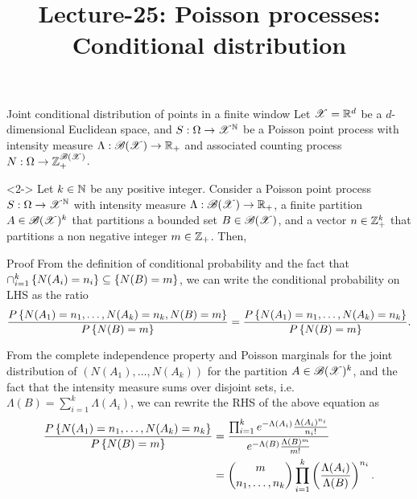 \documentclass[12pt,aspectratio=169]{beamer}
\title{Lecture-25: Poisson processes: Conditional distribution}
\date{}
\begin{document}
\pagestyle{empty}
\maketitle


\begin{frame}{Joint conditional distribution of points in a finite window}
Let $\mathscr{X} =\mathbb{R}^d$ be a $d$-dimensional Euclidean space, 
and $S:\Omega\to\mathscr{X}^{\mathbb{N}}$ be a Poisson point process with intensity measure $\Lambda: \mathscr{B}(\mathscr{X}) \to \mathbb{R}_+$ and associated counting process $N:\Omega\to\mathbb{Z}_+^{\mathscr{B}(\mathscr{X})}$.
\begin{prop}<2->
Let $k \in \mathbb{N}$ be any positive integer. 
Consider a Poisson point process $S: \Omega \to \mathscr{X}^{\mathbb{N}}$ with intensity measure $\Lambda:\mathscr{B}(\mathscr{X})\to\mathbb{R}_+$,  
a finite partition $A\in \mathscr{B}(\mathscr{X})^k$ that partitions a bounded set $B \in \mathscr{B}(\mathscr{X})$, 
and a vector $n \in \mathbb{Z}_+^k$ that partitions a non negative integer $m \in \mathbb{Z}_+$. 
Then, 
\end{prop}
\end{frame}

\begin{frame}
\begin{block}{Proof} 
From the definition of conditional probability and the fact that $\cap_{i=1}^k\left\{N(A_i) = n_i\right\} \subseteq \left\{N(B) =m\right\}$, we can write the conditional probability on LHS as the ratio 
\begin{equation*}
\frac{P\left\{N(A_1) = n_1, \dots, N(A_k) = n_k, N(B) = m\right\}}{P\left\{N(B) = m\right\}} = 
\frac{P\left\{N(A_1) = n_1, \dots, N(A_k) = n_k\right\}}{P\left\{N(B) = m\right\}}.
\end{equation*}
\end{block}
\end{frame}

\begin{frame}
\begin{Proof}
From the complete independence property and Poisson marginals for the joint distribution of $(N(A_1), \dots, N(A_k))$ for the partition $A \in \mathscr{B}(\mathscr{X})^k$, 
and the fact that the intensity measure sums over disjoint sets, i.e. $\Lambda(B) = \sum_{i=1}^k\Lambda(A_i)$, we can rewrite the RHS of the above equation as 
\begin{align*}
\frac{P\left\{N(A_1) = n_1, \dots, N(A_k) = n_k\right\}}{P\left\{N(B) = m\right\}}
&= \frac{\prod_{i=1}^ke^{-\Lambda(A_i)}\frac{\Lambda(A_i)^{n_i}}{n_i!}}{e^{-\Lambda(B)}\frac{\Lambda(B)^m}{m!}}\\
&= \binom{m}{n_1, \dots, n_k}\prod_{i=1}^k\left(\frac{\Lambda(A_i)}{\Lambda(B)}\right)^{n_i}.
\end{align*}
\end{Proof}
\end{frame}
\end{document}

